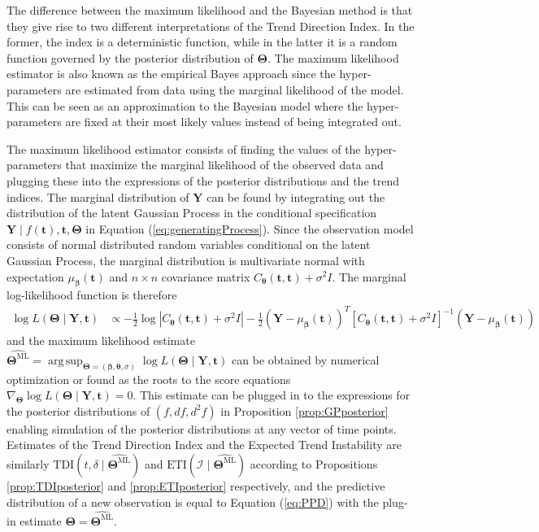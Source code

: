 \documentclass[
  11pt,
]{article}
\theoremstyle{nonumberplain}
\begin{document}
The difference between the maximum likelihood and the Bayesian method is
that they give rise to two different interpretations of the Trend
Direction Index. In the former, the index is a deterministic function,
while in the latter it is a random function governed by the posterior
distribution of \(\bm{\Theta}\). The maximum likelihood estimator is
also known as the empirical Bayes approach since the hyper-parameters
are estimated from data using the marginal likelihood of the model. This
can be seen as an approximation to the Bayesian model where the
hyper-parameters are fixed at their most likely values instead of being
integrated out.

The maximum likelihood estimator consists of finding the values of the
hyper-parameters that maximize the marginal likelihood of the observed
data and plugging these into the expressions of the posterior
distributions and the trend indices. The marginal distribution of
\(\mathbf{Y}\) can be found by integrating out the distribution of the
latent Gaussian Process in the conditional specification
\(\mathbf{Y} \mid f(\mathbf{t}), \mathbf{t}, \bm{\Theta}\) in Equation
(\ref{eq:generatingProcess}). Since the observation model consists of
normal distributed random variables conditional on the latent Gaussian
Process, the marginal distribution is multivariate normal with
expectation \(\mu_{\bm{\beta}}(\mathbf{t})\) and \(n \times n\)
covariance matrix
\(C_{\bm{\theta}}(\mathbf{t}, \mathbf{t}) + \sigma^2 I\). The marginal
log-likelihood function is therefore \begin{align}
\log L(\bm{\Theta} \mid \mathbf{Y}, \mathbf{t}) &\propto - \frac{1}{2}\log |C_{\bm{\theta}}(\mathbf{t}, \mathbf{t}) + \sigma^2 I| - \frac{1}{2}(\mathbf{Y} - \mu_{\bm{\beta}}(\mathbf{t}))^T\left[C_{\bm{\theta}}(\mathbf{t}, \mathbf{t}) + \sigma^2 I\right]^{-1}(\mathbf{Y} - \mu_{\bm{\beta}}(\mathbf{t}))\label{eq:margloglik}
\end{align} and the maximum likelihood estimate
\(\widehat{\bm{\Theta}^\text{ML}} = \mathop{\mathrm{arg\,sup}}_{\bm{\Theta} = (\bm{\beta}, \bm{\theta}, \sigma)} \log L(\bm{\Theta} \mid \mathbf{Y}, \mathbf{t})\)
can be obtained by numerical optimization or found as the roots to the
score equations
\(\nabla_{\bm{\Theta}} \log L(\bm{\Theta} \mid \mathbf{Y}, \mathbf{t}) = 0\).
This estimate can be plugged in to the expressions for the posterior
distributions of \((f, df, d^2\!f)\) in Proposition
\ref{prop:GPposterior} enabling simulation of the posterior
distributions at any vector of time points. Estimates of the Trend
Direction Index and the Expected Trend Instability are similarly
\(\mathrm{TDI}(t, \delta \mid \widehat{\bm{\Theta}^\text{ML}})\) and
\(\mathrm{ETI}(\mathcal{I} \mid \widehat{\bm{\Theta}^\text{ML}})\)
according to Propositions \ref{prop:TDIposterior} and
\ref{prop:ETIposterior} respectively, and the predictive distribution of
a new observation is equal to Equation (\ref{eq:PPD}) with the plug-in
estimate \(\bm{\Theta} = \widehat{\bm{\Theta}^\text{ML}}\).
\end{document}
